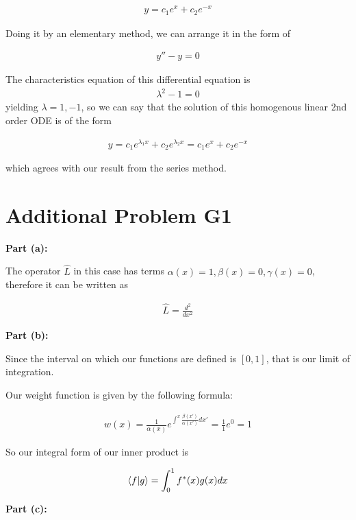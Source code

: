 \documentclass{article}
\numberwithin{equation}{section}
\begin{document}
\begin{align}
    y = c_1 e^x + c_2 e^{-x}
\end{align}

Doing it by an elementary method, we can arrange it in the form of 

\begin{align}
    y'' - y = 0
\end{align}

The characteristics equation of this differential equation is \begin{align}
    \lambda^2 - 1 = 0
\end{align}
yielding $\lambda = 1, -1$, so we can say that the solution of this homogenous linear 2nd order ODE is of the form

\begin{align}
    y = c_1 e^{\lambda_1 x} + c_2 e^{\lambda_2 x} = c_1 e^x + c_2 e^{-x}
\end{align}

which agrees with our result from the series method.

\section{Additional Problem G1}

\textbf{Part (a):}

The operator $\hat{L}$ in this case has terms $\alpha(x) = 1, \beta(x) = 0, \gamma(x) = 0$, therefore it can be written as 

\begin{align}
    \hat{L} = \frac{d^2}{dx^2}
\end{align}

\textbf{Part (b):}

Since the interval on which our functions are defined is $[0,1]$, that is our limit of integration.

Our weight function is given by the following formula:

\begin{align}
    w(x) = \frac{1}{\alpha(x)} e^{\int^{x} \frac{\beta(x')}{\alpha(x')}dx'} = \frac{1}{1} e^0 = 1
\end{align}

So our integral form of our inner product is

\begin{align}
    \bra{f} \ket{g} = \int_{0}^{1} f^*(x) g(x) dx
\end{align}

\textbf{Part (c):}
\end{document}

